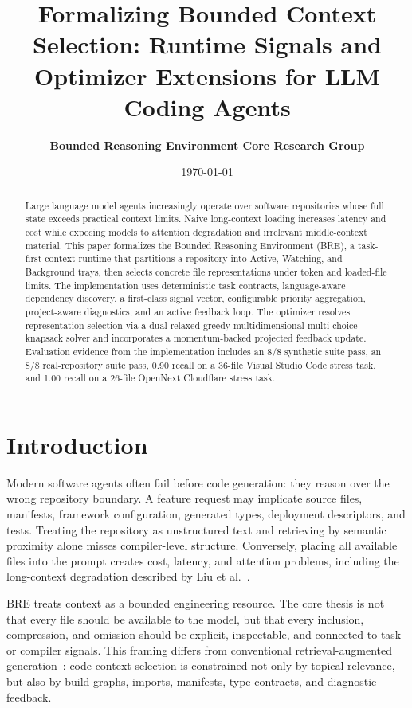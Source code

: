 \documentclass[11pt,onecolumn]{article}
\title{\textbf{Formalizing Bounded Context Selection: Runtime Signals and Optimizer Extensions for LLM Coding Agents}}
\author{\textbf{Bounded Reasoning Environment Core Research Group}}
\date{\today}
\begin{document}
\maketitle

\begin{abstract}
Large language model agents increasingly operate over software repositories whose full state exceeds practical context limits. Naive long-context loading increases latency and cost while exposing models to attention degradation and irrelevant middle-context material. This paper formalizes the Bounded Reasoning Environment (BRE), a task-first context runtime that partitions a repository into Active, Watching, and Background trays, then selects concrete file representations under token and loaded-file limits. The implementation uses deterministic task contracts, language-aware dependency discovery, a first-class signal vector, configurable priority aggregation, project-aware diagnostics, and an active feedback loop. The optimizer resolves representation selection via a dual-relaxed greedy multidimensional multi-choice knapsack solver and incorporates a momentum-backed projected feedback update. Evaluation evidence from the implementation includes an 8/8 synthetic suite pass, an 8/8 real-repository suite pass, 0.90 recall on a 36-file Visual Studio Code stress task, and 1.00 recall on a 26-file OpenNext Cloudflare stress task.
\end{abstract}

\section{Introduction}
Modern software agents often fail before code generation: they reason over the wrong repository boundary. A feature request may implicate source files, manifests, framework configuration, generated types, deployment descriptors, and tests. Treating the repository as unstructured text and retrieving by semantic proximity alone misses compiler-level structure. Conversely, placing all available files into the prompt creates cost, latency, and attention problems, including the long-context degradation described by Liu et al.~\cite{liu2024lost}.

BRE treats context as a bounded engineering resource. The core thesis is not that every file should be available to the model, but that every inclusion, compression, and omission should be explicit, inspectable, and connected to task or compiler signals. This framing differs from conventional retrieval-augmented generation~\cite{lewis2020retrieval}: code context selection is constrained not only by topical relevance, but also by build graphs, imports, manifests, type contracts, and diagnostic feedback.
\end{document}

